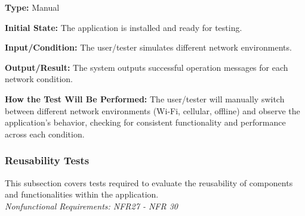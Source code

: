 \documentclass[12pt, titlepage]{article}
\begin{document}
\begin{enumerate}
\textbf{Type:} Manual
					
\textbf{Initial State:} The application is installed and ready for testing.
					
\textbf{Input/Condition:} The user/tester simulates different network
environments.
					
\textbf{Output/Result:} The system outputs successful operation messages for
each network condition.
					
\textbf{How the Test Will Be Performed:} The user/tester will manually switch
between different network environments (Wi-Fi, cellular, offline) and observe
the application's behavior, checking for consistent functionality and
performance across each condition.

\end{enumerate}

\subsubsection{Reusability Tests}

This subsection covers tests required to evaluate the reusability of components and functionalities within the application. \\
\textit{Nonfunctional Requirements: NFR27 - NFR 30}
\end{document}
